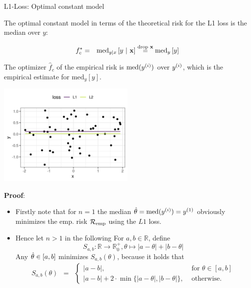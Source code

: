 \documentclass[11pt,compress,t,notes=noshow, xcolor=table]{beamer}
\begin{document}
\begin{vbframe}{L1-Loss: Optimal constant model}

The optimal constant model in terms of the theoretical risk for the L1 loss is the median over $y$:

\begin{eqnarray*}
  f_{c}^{\ast} &=& \text{med}_{y|x} \left[y ~|~ \mathbf{x} \right] \overset{\text{drop } \mathbf{x}}{=}  \text{med}_{y} \left[y \right]
  \end{eqnarray*} 

The optimizer $\hat{f}_c$ of the empirical risk is $\text{med}(y^{(i)})$ over $y^{(i)}$, which is the empirical estimate for $\text{med}_{y} \left[y \right]$. 

\vspace*{-0.3cm}

\begin{center}
\includegraphics[width = 0.5\textwidth ]{figure/l1_vs_l2.png} \\
\end{center}


\framebreak 

\textbf{Proof}: 

\begin{itemize}
  \item Firstly note that for $n = 1$ the median $\hat{\theta} = \text{med}(y^{(i)}) = y^{(1)}$ obviously minimizes the emp. risk $\mathcal{R}_{\text{emp}}$ using the $L1$ loss. 



  \item Hence let $n > 1$ in the following For $a,b \in \mathbb{R}$, define 
  $$
    S_{a,b}:\mathbb{R} \rightarrow \mathbb{R}^+_0, \theta \mapsto |a- \theta| + |b-\theta|
  $$
  \vspace*{-0.3cm}
  Any $\hat{\theta} \in [a,b]$ minimizes $S_{a,b}(\theta)$, because it holds that
  \vspace*{-0.0cm}
  \begin{eqnarray*}
  S_{a,b}(\theta) &=& \begin{cases}|a-b| ,& \text{ for } \theta \in [a,b]\\ |a-b| + 2\cdot\min\{|a-\theta|,|b-\theta|\}
  ,& \text{ otherwise. }\end{cases}
  \end{eqnarray*}


\end{itemize}
\end{vbframe}
\end{document}
